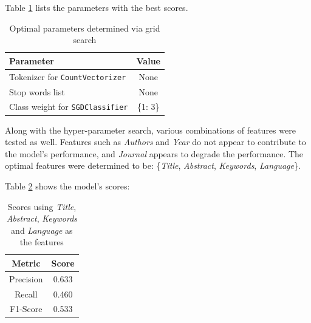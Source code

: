 \documentclass[11pt]{article}
\begin{document}
Table \ref{table:gs1_param} lists the parameters with the best scores.
\begin{table}[!ht]
    \caption{Optimal parameters determined via grid search}
    \label{table:gs1_param}
    \begin{center}

        \begin{tabular}{| l | c |}
        \hline
        \textbf{Parameter} & \textbf{Value}
        \\ \hline
        Tokenizer for \texttt{CountVectorizer} & None
        \\ \hline
        Stop words list & None
        \\ \hline
        Class weight for \texttt{SGDClassifier} & \{1: 3\}
        \\ \hline
        \end{tabular}

    \end{center}

\end{table}

Along with the hyper-parameter search, various combinations of features were tested as well. Features such as \textit{Authors} and \textit{Year} do not appear to contribute to the model's performance, and \textit{Journal} appears to degrade the performance. The optimal features were determined to be: \{\textit{Title}, \textit{Abstract}, \textit{Keywords}, \textit{Language}\}.

Table \ref{table:gs1_score} shows the model's scores:
\begin{table}[!ht]
    \caption{Scores using \textit{Title}, \textit{Abstract}, \textit{Keywords} and \textit{Language} as the features}
    \label{table:gs1_score}
    \begin{center}

        
        
        \begin{tabular}{| c | c |}
        \hline
        \textbf{Metric} & \textbf{Score}
        \\ \hline
        Precision & 0.633 
        \\ \hline
        Recall & 0.460
        \\ \hline
        F1-Score & 0.533
        \\ \hline
        \end{tabular}

    \end{center}

\end{table}
\end{document}
